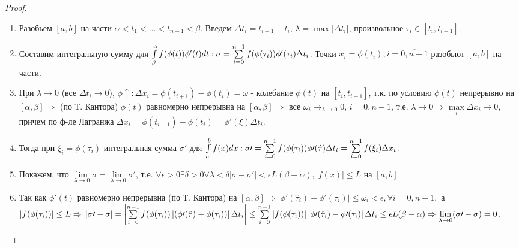 \documentclass{article}
\newtheorem{proof}{\underline{Доказательство}}[theorem]
\begin{document}
		\begin{proof}
			\begin{enumerate}

				\item Разобьем $[a,b]$ на части $\alpha<t_1<...<t_{n-1}<\beta$. Введем $\Delta t_i=t_{i+1}-t_i$, $\lambda=\max|\Delta t_i|$, произвольное $\tau_i \in [t_i,t_{i+1}]$.

				\item Составим интегральную сумму для $\int\limits^\alpha_\beta f(\phi(t))\phi^\prime(t)dt: \\
				\sigma=\sum\limits^{n-1}_{i=0}f(\phi(\tau_i))\phi^\prime(\tau_i)\Delta t_i$. Точки $x_i=\phi(t_i), i=\overline{0,n-1}$ разобьют $[a,b]$ на части.

				\item При $\lambda \rightarrow 0$ (все $\Delta t_i \rightarrow 0$), $\phi\uparrow: \Delta x_i=\phi(t_{i+1})-\phi(t_i)=\omega$ - колебание $\phi(t)$ на $[t_i,t_{i+1}]$, т.к. по условию $\phi(t)$ непрерывно на $[\alpha,\beta] \Rightarrow $ (по Т. Кантора) $\phi(t)$ равномерно непрерывна на $[\alpha,\beta] \Rightarrow$ все $\omega_i \rightarrow_{\lambda \rightarrow 0} 0$, $i=\overline{0,n-1}$, т.е. $\lambda \rightarrow 0 \Rightarrow \max\limits_i \Delta x_i \rightarrow 0$, причем по ф-ле Лагранжа $\Delta x_i=\phi(t_{i+1})-\phi(t_i)=\phi\prime(\xi)\Delta t_i$.

				\item Тогда при $\xi_i = \phi(\tau_i)$ интегральная сумма $\sigma\prime$ для $\int\limits^b_af(x)dx: \\
				\sigma\prime=\sum\limits^{n-1}_{i=0}f(\phi(\tau_i))\phi\prime(\hat\tau)\Delta t_i = \sum\limits^{n-1}_{i=0}f(\xi_i)\Delta x_i$.

				\item Покажем, что $\lim\limits_{\lambda \rightarrow 0}\sigma=\lim\limits_{\lambda \rightarrow 0}\sigma\prime$, т.е. $\forall \epsilon>0 \exists\delta>0 \forall\lambda<\delta |\sigma-\sigma\prime|<\epsilon L(\beta-\alpha), |f(x)|\leq L$ на $[a,b]$.

				\item Так как $\phi\prime(t)$ равномерно непрерывна (по Т. Кантора) на $[\alpha,\beta] \Rightarrow \left|\phi\prime(\hat\tau_i)-\phi\prime(\tau_i)\right|\leq\omega_i<\epsilon, \forall i = \overline{0,n-1},$ а $\left|f(\phi(\tau_i))\right| \leq L \Rightarrow \\
				\left|\sigma\prime-\sigma\right| = \left|\sum\limits^{n-1}_{i=0} f(\phi(\tau_i))\left|(\phi\prime(\hat\tau)-\phi(\tau_i))\right|\Delta t_i\right| \leq \sum\limits^{n-1}_{i=0}\left|f(\phi(\tau_i))\right|\left|\phi\prime(\hat\tau_i)-\phi\prime(\tau_i)\right|\Delta t_i \leq \epsilon L(\beta-\alpha) \Rightarrow \lim\limits_{\lambda \rightarrow 0}(\sigma\prime-\sigma) = 0$. 

			\end{enumerate}
		\end{proof}
\end{document}
